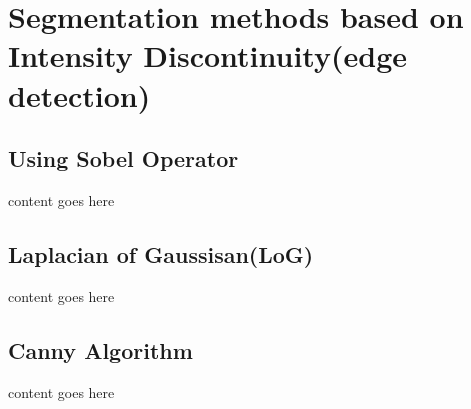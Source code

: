 \chapter{Segmentation methods based on Intensity Discontinuity(edge detection)}
\section{Using Sobel Operator}
content goes here

\section{Laplacian of Gaussisan(LoG)}
content goes here

\section{Canny Algorithm}
content goes here
